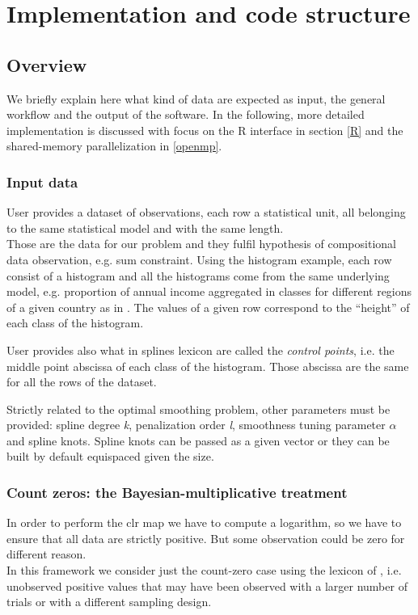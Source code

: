 \chapter{Implementation and code structure}
\label{code}

\noindent 



\section{Overview}
We briefly explain here what kind of data are expected as input, the general workflow and the output of the software. In the following,  more detailed implementation is discussed with focus on the R interface in section \ref{R} and the shared-memory parallelization in \ref{openmp}.

\subsection{Input data}
User provides a dataset of observations, each row a statistical unit, all belonging to the same statistical model and with the same length. \\
Those are the data for our problem and they fulfil hypothesis of compositional data observation, e.g. sum constraint. Using the histogram example, each row consist of a histogram and all the histograms come from the same underlying model, e.g. proportion of annual income aggregated in classes for different regions of a given country as in \cite{paper:pacs}. The values of a given row correspond to the ``height'' of each class of the histogram.

User provides also what in splines lexicon are called the \textit{control points}, i.e. the middle point abscissa of each class of the histogram. Those abscissa are the same for all the rows of the dataset.

Strictly related to the optimal smoothing problem, other parameters must be provided: spline degree \textit{k}, penalization order \textit{l}, smoothness tuning parameter \textit{$\alpha$} and spline knots. Spline knots can be passed as a given vector or they can be built by default equispaced given the size.

\subsection{Count zeros: the Bayesian-multiplicative treatment} \label{BM}
In order to perform the clr map we have to compute a logarithm, so we have to ensure that all data are strictly positive. But some observation could be zero for different reason. \\ In this framework we consider just the count-zero case using the lexicon of \cite{fernandez:zeros}, i.e. unobserved positive values that may have been observed with a larger number of trials or with a different sampling design.


